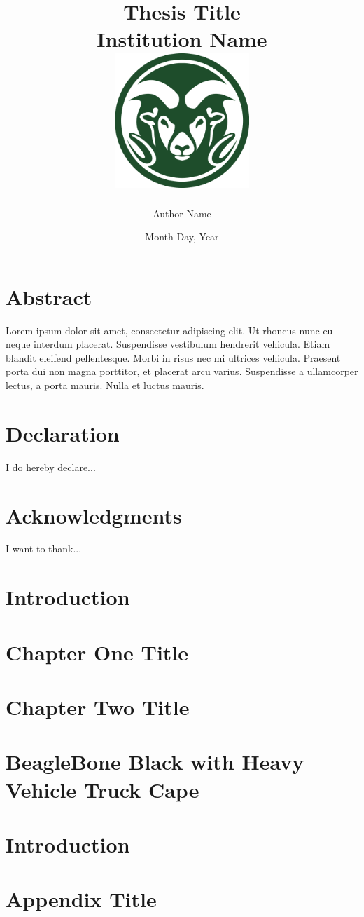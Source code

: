 \documentclass[11pt,twoside]{report}
\title{
	{Thesis Title}\\
	{\large Institution Name}\\
	{\includegraphics[width=2in]{universitylogo.png}}
}
\author{Author Name}
\date{Month Day, Year}
\begin{document}
\maketitle
\chapter*{Abstract}
Lorem ipsum dolor sit amet, consectetur adipiscing elit. Ut rhoncus nunc eu neque interdum placerat. Suspendisse vestibulum hendrerit vehicula. Etiam blandit eleifend pellentesque. Morbi in risus nec mi ultrices vehicula. Praesent porta dui non magna porttitor, et placerat arcu varius. Suspendisse a ullamcorper lectus, a porta mauris. Nulla et luctus mauris. 

\chapter*{Declaration}
I do hereby declare...

\chapter*{Acknowledgments}
I want to thank...

\tableofcontents

\chapter{Introduction}


\chapter{Chapter One Title}


\chapter{Chapter Two Title}


\chapter{BeagleBone Black with Heavy Vehicle Truck Cape}


\chapter{Introduction}


\appendix
\chapter{Appendix Title}

\end{document}
